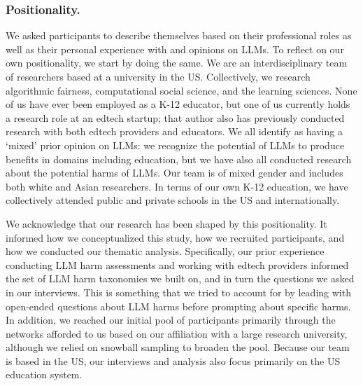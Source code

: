 \subsubsection*{Positionality.}
We asked participants to describe themselves based on their professional roles as well as their personal experience with and opinions on LLMs. To reflect on our own positionality, we start by doing the same. We are an interdisciplinary team of researchers based at a university in the US. Collectively, we research algorithmic fairness, computational social science, and the learning sciences. None of us have ever been employed as a K-12 educator, but one of us currently holds a research role at an edtech startup; that author also has previously conducted research with both edtech providers and educators. We all identify as having a `mixed' prior opinion on LLMs: we recognize the potential of LLMs to produce benefits in domains including education, but we have also all conducted research about the potential harms of LLMs. Our team is of mixed gender and includes both white and Asian researchers. In terms of our own K-12 education, we have collectively attended public and private schools in the US and internationally.

We acknowledge that our research has been shaped by this positionality. It informed how we conceptualized this study, how we recruited participants, and how we conducted our thematic analysis. Specifically, our prior experience conducting LLM harm assessments and working with edtech providers informed the set of LLM harm taxonomies we built on, and in turn the questions we asked in our interviews. This is something that we tried to account for by leading with open-ended questions about LLM harms before prompting about specific harms. In addition, we reached our initial pool of participants primarily through the networks afforded to us based on our affiliation with a large research university, although we relied on snowball sampling to broaden the pool. Because our team is based in the US, our interviews and analysis also focus primarily on the US education system.